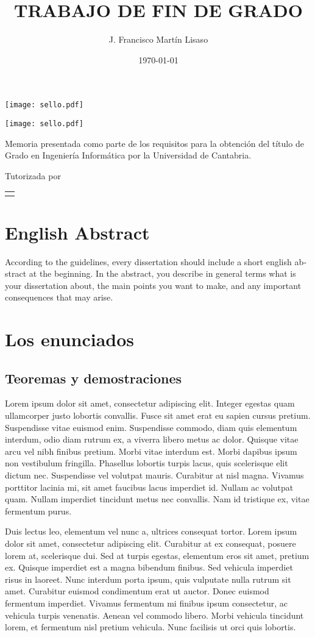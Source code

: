 \documentclass[12pt, twoside]{book}
\title{TRABAJO DE FIN DE GRADO}
\author{J. Francisco Martín Lisaso}
\date{\today}
\makeatletter
\renewcommand\maketitle{%
  \begin{titlepage}
      \vspace*{1.5cm}
      \parskip=0pt
      \Huge\bfseries
      \begin{center}
          \leavevmode\texttt{[image: sello.pdf]}\\[2cm]
          \@title
      \end{center}
      \vspace{1cm}
      \begin{center}
          \@author
      \end{center}
  \end{titlepage}

  \begin{titlepage}
  \parindent=0pt
  \begin{flushleft}
  \vspace*{1.5mm}
  \setlength\baselineskip{0pt}
  \setlength\parskip{0mm}
  \begin{center}
      \leavevmode\texttt{[image: sello.pdf]}
  \end{center}
  \end{flushleft}
  \vspace{1cm}
  \bgroup
  \Large \bfseries
  \begin{center}
  \@title
  \end{center}
  \egroup
  \vspace*{.5cm}
  \begin{center}
  \@author
  \end{center}
  \vspace*{1.8cm}
  \begin{flushright}
  \begin{minipage}{8.45cm}
      Memoria presentada como parte de los requisitos para la obtención del título de
      Grado en Ingeniería Informática por la Universidad de Cantabria.

      \vspace*{7.5mm}

      Tutorizada por
  \end{minipage}\par
  \begin{tabularx}{8.45cm}[b]{@{}l}
      \guardatutores
  \end{tabularx}
   \end{flushright}
      \vspace*{\fill}
   \end{titlepage}
   \pagestyle{tfg}
   \renewcommand{\chaptermark}[1]{\markright{\thechapter.\space ##1}}
   \renewcommand{\sectionmark}[1]{}
   \renewcommand{\subsectionmark}[1]{}
  }
\makeatother
\begin{document}
\maketitle

\frontmatter
\tableofcontents

\mainmatter

\chapter*{English Abstract}

\begin{otherlanguage}{english}
    According to the guidelines, every dissertation should include a short english abstract at the beginning. In the abstract, you describe in general terms what is your dissertation about, the main points you want to make, and any important consequences that may arise.
\end{otherlanguage}


\chapter{Los enunciados}

\section{Teoremas y demostraciones}

Lorem ipsum dolor sit amet\cite{Montfort2004}, consectetur adipiscing elit. Integer egestas quam ullamcorper justo lobortis convallis. Fusce sit amet erat eu sapien cursus pretium. Suspendisse vitae euismod enim. Suspendisse commodo, diam quis elementum interdum, odio diam rutrum ex, a viverra libero metus ac dolor. Quisque vitae arcu vel nibh finibus pretium. Morbi vitae interdum est. Morbi dapibus ipsum non vestibulum fringilla. Phasellus lobortis turpis lacus, quis scelerisque elit dictum nec. Suspendisse vel volutpat mauris. Curabitur at nisl magna. Vivamus porttitor lacinia mi, sit amet faucibus lacus imperdiet id. Nullam ac volutpat quam. Nullam imperdiet tincidunt metus nec convallis. Nam id tristique ex, vitae fermentum purus.

Duis lectus leo, elementum vel nunc a, ultrices consequat tortor. Lorem ipsum dolor sit amet, consectetur adipiscing elit. Curabitur at ex consequat, posuere lorem at, scelerisque dui. Sed at turpis egestas, elementum eros sit amet, pretium ex. Quisque imperdiet est a magna bibendum finibus. Sed vehicula imperdiet risus in laoreet. Nunc interdum porta ipsum, quis vulputate nulla rutrum sit amet. Curabitur euismod condimentum erat ut auctor. Donec euismod fermentum imperdiet. Vivamus fermentum mi finibus ipsum consectetur, ac vehicula turpis venenatis. Aenean vel commodo libero. Morbi vehicula tincidunt lorem, et fermentum nisl pretium vehicula. Nunc facilisis ut orci quis lobortis.
\end{document}
